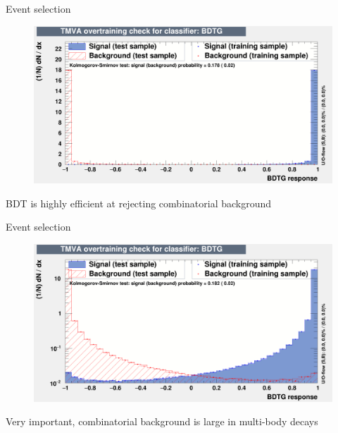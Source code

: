 \documentclass{beamer}
\begin{document}
\begin{frame}{Event selection}
  \begin{figure}
    \centering
    \includegraphics[width = 1.0\textwidth]{Plots/overtrain_BDTG.png}
  \end{figure}
  \begin{center}
    BDT is highly efficient at rejecting combinatorial background
  \end{center}
\end{frame}

\begin{frame}{Event selection}
  \begin{figure}
    \centering
    \includegraphics[width = 1.0\textwidth]{Plots/overtrain_BDTG_log.png}
  \end{figure}
  \begin{center}
    Very important, combinatorial background is large in multi-body decays
  \end{center}
\end{frame}
\end{document}
